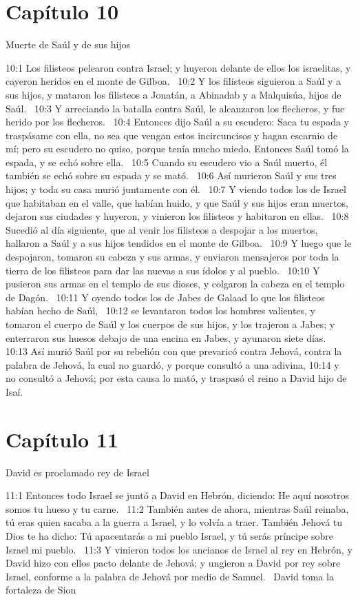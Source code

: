 \section*{Capítulo 10}
Muerte de Saúl y de sus hijos   

10:1 Los filisteos pelearon contra Israel; y huyeron delante de ellos los israelitas, y cayeron heridos en el monte de Gilboa.  
10:2 Y los filisteos siguieron a Saúl y a sus hijos, y mataron los filisteos a Jonatán, a Abinadab y a Malquisúa, hijos de Saúl.  
10:3 Y arreciando la batalla contra Saúl, le alcanzaron los flecheros, y fue herido por los flecheros.  
10:4 Entonces dijo Saúl a su escudero: Saca tu espada y traspásame con ella, no sea que vengan estos incircuncisos y hagan escarnio de mí; pero su escudero no quiso, porque tenía mucho miedo. Entonces Saúl tomó la espada, y se echó sobre ella.  
10:5 Cuando su escudero vio a Saúl muerto, él también se echó sobre su espada y se mató.  
10:6 Así murieron Saúl y sus tres hijos; y toda su casa murió juntamente con él.  
10:7 Y viendo todos los de Israel que habitaban en el valle, que habían huido, y que Saúl y sus hijos eran muertos, dejaron sus ciudades y huyeron, y vinieron los filisteos y habitaron en ellas.  
10:8 Sucedió al día siguiente, que al venir los filisteos a despojar a los muertos, hallaron a Saúl y a sus hijos tendidos en el monte de Gilboa.  
10:9 Y luego que le despojaron, tomaron su cabeza y sus armas, y enviaron mensajeros por toda la tierra de los filisteos para dar las nuevas a sus ídolos y al pueblo.  
10:10 Y pusieron sus armas en el templo de sus dioses, y colgaron la cabeza en el templo de Dagón.  
10:11 Y oyendo todos los de Jabes de Galaad lo que los filisteos habían hecho de Saúl,  
10:12 se levantaron todos los hombres valientes, y tomaron el cuerpo de Saúl y los cuerpos de sus hijos, y los trajeron a Jabes; y enterraron sus huesos debajo de una encina en Jabes, y ayunaron siete días.  
10:13 Así murió Saúl por su rebelión con que prevaricó contra Jehová, contra la palabra de Jehová, la cual no guardó, y porque consultó a una adivina, 
10:14 y no consultó a Jehová; por esta causa lo mató, y traspasó el reino a David hijo de Isaí.  
\section*{Capítulo 11 }
David es proclamado rey de Israel   

11:1 Entonces todo Israel se juntó a David en Hebrón, diciendo: He aquí nosotros somos tu hueso y tu carne.  
11:2 También antes de ahora, mientras Saúl reinaba, tú eras quien sacaba a la guerra a Israel, y lo volvía a traer. También Jehová tu Dios te ha dicho: Tú apacentarás a mi pueblo Israel, y tú serás príncipe sobre Israel mi pueblo.  
11:3 Y vinieron todos los ancianos de Israel al rey en Hebrón, y David hizo con ellos pacto delante de Jehová; y ungieron a David por rey sobre Israel, conforme a la palabra de Jehová por medio de Samuel.  
David toma la fortaleza de Sion  

